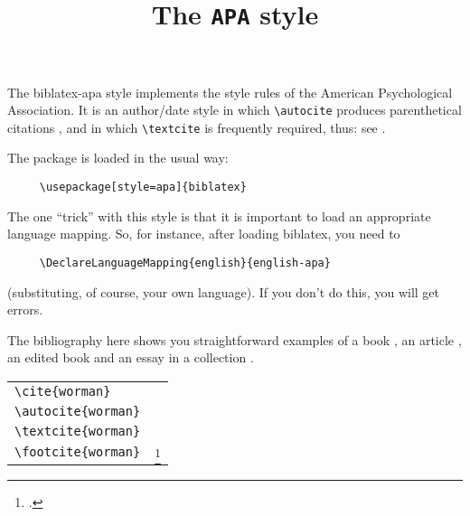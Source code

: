 \documentclass[varwidth=\textwidth,class=article,border=5pt]{standalone}
\begin{document}
\title{The \texttt{APA} style}
\author{}\date{}
\maketitle


The \textsf{biblatex-apa} style implements the style rules of the American Psychological Association. It is an author/date style in which \verb~\autocite~ produces parenthetical citations \autocite{worman, reese}, and in which \verb~\textcite~ is frequently required, thus: see \textcite{worman}.

\quad The package is loaded in the usual way:
\begin{verbatim}
     \usepackage[style=apa]{biblatex}
\end{verbatim}
The one \enquote{trick} with this style is that it is important to load an appropriate language mapping. So, for instance, after loading \textsf{biblatex}, you need to
\begin{verbatim}
     \DeclareLanguageMapping{english}{english-apa}
\end{verbatim}
(substituting, of course, your own language). If you don't do this, you will get errors.

\quad The bibliography here shows you straightforward examples of a book \autocite{worman}, an article \autocite{reese}, an edited book \autocite{aristotle:anima} and an essay in a collection \autocite{gaonkar:in}.

\medskip

\begin{tabular}{ll}
\verb|\cite{worman}| & \cite{worman} \\
\verb|\autocite{worman}| & \autocite{worman} \\
\verb|\textcite{worman}| & \textcite{worman} \\
\verb|\footcite{worman}| & \strut\footcite{worman}
\end{tabular}


\printbibliography
\end{document}
